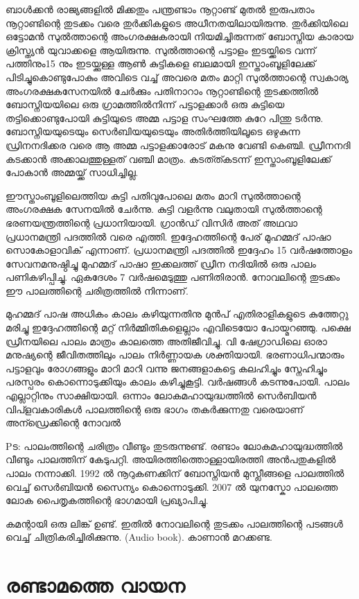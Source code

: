 \documentclass[10pt,a4paper]{report}
\begin{document}
ബാൾക്കൻ രാജ്യങ്ങളിൽ മിക്കതും പന്ത്രണ്ടാം നൂറ്റാണ്ട് മുതൽ ഇരുപതാം നൂറ്റാണ്ടിന്റെ തുടക്കം വരെ തുർക്കികളുടെ അധീനതയിലായിരുന്നു. തുർക്കിയിലെ ഒട്ടോമൻ സുൽത്താന്റെ അംഗരക്ഷകരായി നിയമിച്ചിരുന്നത് ബോസ്നിയ കാരായ ക്രിസ്ത്യൻ യുവാക്കളെ ആയിരുന്നു. സുൽത്താന്റെ പട്ടാളം ഇടയ്ക്കിടെ വന്ന് പത്തിനും15 നും ഇടയ്ക്കുള്ള ആൺ കുട്ടികളെ ബലമായി ഇസ്താംബൂളിലേക്ക് പിടിച്ചുകൊണ്ടുപോകും അവിടെ വച്ച് അവരെ മതം മാറ്റി സുൽത്താന്റെ സ്വകാര്യ അംഗരക്ഷകസേനയിൽ ചേർക്കും
പതിനാറാം നൂറ്റാണ്ടിന്റെ തുടക്കത്തിൽ ബോസ്നിയയിലെ ഒരു ഗ്രാമത്തിൽനിന്ന് പട്ടാളക്കാർ ഒരു കുട്ടിയെ തട്ടിക്കൊണ്ടുപോയി കുട്ടിയുടെ അമ്മ പട്ടാള സംഘത്തേ കുറേ പിന്തു ടർന്നു.
ബോസ്നിയയുടെയും സെർബിയയുടെയും അതിർത്തിയിലൂടെ ഒഴുകുന്ന ഡ്രിനനദിക്കര വരെ ആ അമ്മ പട്ടാളക്കാരോട് മകനു വേണ്ടി കെഞ്ചി. ഡ്രീനനദി കടക്കാൻ അക്കാലത്തുള്ളത് വഞ്ചി മാത്രം. കടത്ത്കടന്ന് ഇസ്താംബൂളിലേക്ക് പോകാൻ അമ്മയ്ക്ക് സാധിച്ചില്ല.

ഈസ്താംബൂളിലെത്തിയ കുട്ടി പതിവുപോലെ മതം മാറി സുൽത്താന്റെ അംഗരക്ഷക സേനയിൽ ചേർന്നു. കുട്ടി വളർന്നു വലുതായി സുൽത്താന്റെ ഭരണയന്ത്രത്തിന്റെ പ്രധാനിയായി. ഗ്രാൻഡ് വിസിർ അത് അഥവാ പ്രധാനമന്ത്രി പദത്തിൽ വരെ എത്തി.
ഇദ്ദേഹത്തിന്റെ പേര് മുഹമ്മദ് പാഷാ സൊകോളാവിക് എന്നാണ്. പ്രധാനമന്ത്രി പദത്തിൽ ഇദ്ദേഹം 15 വർഷത്തോളം സേവനമനുഷ്ഠിച്ചു മുഹമ്മദ് പാഷാ ഇക്കലത്ത് ഡ്രീന നദിയിൽ ഒരു പാലം പണികഴിപ്പിച്ചു. ഏകദേശം 7 വർഷമെടുത്തു പണിതിരാൻ. നോവലിന്റെ തുടക്കം ഈ പാലത്തിന്റെ ചരിത്രത്തിൽ നിന്നാണ്.

മുഹമ്മദ് പാഷ അധികം കാലം കഴിയുന്നതിനു മുൻപ് എതിരാളികളുടെ കുത്തേറ്റു മരിച്ചു ഇദ്ദേഹത്തിന്റെ മറ്റ് നിർമ്മിതികളെല്ലാം എവിടെയോ പോയ്മറഞ്ഞു. പക്ഷെ ഡ്രീനയിലെ പാലം മാത്രം കാലത്തെ അതിജീവിച്ചു. വി ഷേഗ്രാഡിലെ ഓരാ മനുഷ്യന്റെ ജീവിതത്തിലും പാലം നിർണ്ണായക ശക്തിയായി. ഭരണാധിപന്മാരും പട്ടാളവും രോഗങ്ങളും മാറി മാറി വന്നു ജനങ്ങളാകട്ടെ കലഹിച്ചും സ്നേഹിച്ചും പരസ്പരം കൊന്നൊടുക്കിയും കാലം കഴിച്ചുകൂട്ടി.
വർഷങ്ങൾ കടന്നുപോയി. പാലം എല്ലാറ്റിനും സാക്ഷിയായി. ഒന്നാം ലോകമഹായുദ്ധത്തിൽ സെർബിയൻ വിപ്ളവകാരികൾ പാലത്തിന്റെ ഒരു ഭാഗം തകർക്കുന്നതു വരെയാണ് അന്ഡ്രെക്കിന്റെ നോവൽ

Pട: പാലംത്തിന്റെ ചരിത്രം വീണ്ടും തുടരുന്നുണ്ട്. രണ്ടാം ലോകമഹായുദ്ധത്തിൽ വീണ്ടും പാലത്തിന് കേടുപറ്റി. അയിരത്തിത്തൊള്ളായിരത്തി അൻപതുകളിൽ പാലം നന്നാക്കി. 1992 ൽ നൂറുകണക്കിന് ബോസ്നിയൻ മുസ്ലീങ്ങളെ പാലത്തിൽ വെച്ച് സെർബിയൻ സൈന്യം കൊന്നൊടുക്കി.
2007 ൽ യുനസ്കോ പാലത്തെ ലോക പൈതൃകത്തിന്റെ ഭാഗമായി പ്രഖ്യാപിച്ചു.

കമന്റായി ഒരു ലിങ്ക് ഉണ്ട്. ഇതിൽ നോവലിന്റെ തുടക്കം പാലത്തിന്റെ പടങ്ങൾ വെച്ച് ചിത്രികരിച്ചിരിക്കുന്നു. (Audio book). കാണാൻ മറക്കണ്ട.


  \section{രണ്ടാമത്തെ വായന }
  
\end{document}
